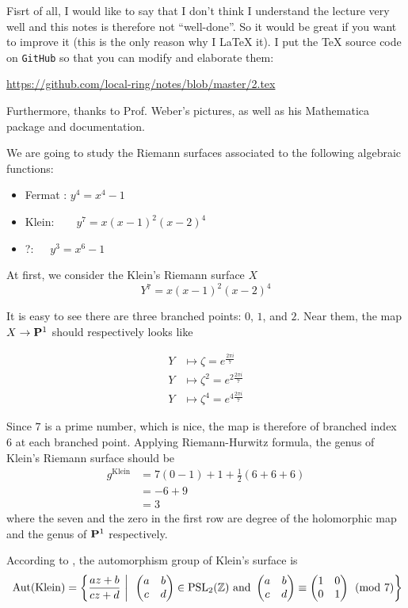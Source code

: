 Fisrt of all, I would like to say that I don't think I understand the lecture very well and this notes is therefore not ``well-done''. So it would be great if you want to improve it (this is the only reason why I \LaTeX{} it). I put the \TeX{} source code on \texttt{GitHub} so that you can modify and elaborate them:\begin{center}
 \url{https://github.com/local-ring/notes/blob/master/2.tex}   
\end{center}

Furthermore, thanks to Prof. Weber's pictures, as well as his Mathematica package and documentation.\\
\par


We are going to study the Riemann surfaces associated to the following algebraic functions:
\begin{itemize}
    \item Fermat : $y^4=x^4-1$
    \item Klein:\ \  \ \  $y^7=x(x-1)^2(x-2)^4$
    \item ?:\ \ \   \quad \quad   $y^3=x^6-1$
\end{itemize}

At first, we consider the Klein's Riemann surface $X$
$$Y^7=x(x-1)^2(x-2)^4$$

It is easy to see there are three branched points: $0$, $1$, and $2$. Near them, the map $X\rightarrow \mathbf{P}^{1}$ should respectively looks like 

\[\begin{aligned}
    Y & \mapsto \zeta = e^{\frac{2\pi i}{7}}\\
    Y & \mapsto \zeta^{2} = e^{2\frac{2\pi i}{7}}\\
    Y & \mapsto \zeta^{4} = e^{4\frac{2\pi i}{7}}
\end{aligned}\]

Since $7$ is a prime number, which is nice, the map is therefore of branched index $6$ at each branched point. Applying Riemann-Hurwitz formula, the genus of Klein's Riemann surface should be 
\[\begin{aligned}
g^{\mathrm{Klein}}&=7(0-1)+1+\frac{1}{2}(6+6+6)\\
&=-6+9\\
&=3
\end{aligned}\]
where the seven and the zero in the first row are degree of the holomorphic map and the genus of $\mathbf{P}^1$ respectively. \par

According to \cite{MR1722412}, the automorphism group of Klein's surface is 
\[\Aut(\mathrm{Klein})=\left\{\frac{az+b}{cz+d}~~\bigg|\,\ \begin{pmatrix}a&b\\c&d\end{pmatrix}\in \mathrm{PSL}_2(\Z) \text{~~and ~~}\begin{pmatrix}a&b\\c&d\end{pmatrix}\equiv \begin{pmatrix}1&0\\0&1\end{pmatrix} \pmod{7}\right\}\]


